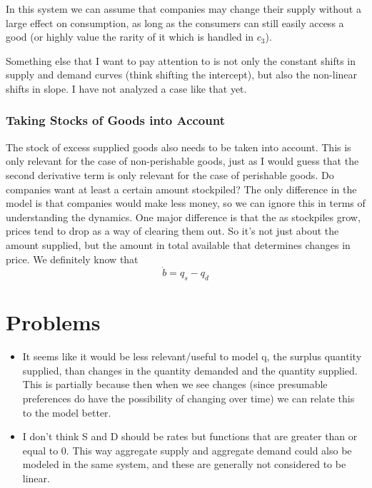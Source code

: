 \documentclass{article}
\begin{document}
In this system we can assume that companies may change their supply without a large effect on consumption, as long as the consumers can still easily access a good (or highly value the rarity of it which is handled in $c_3$).

Something else that I want to pay attention to is not only the constant shifts in supply and demand curves (think shifting the intercept), but also the non-linear shifts in slope. I have not analyzed a case like that yet.

\subsubsection{Taking Stocks of Goods into Account}
The stock of excess supplied goods also needs to be taken into account. This is only relevant for the case of non-perishable goods, just as I would guess that the second derivative term is only relevant for the case of perishable goods. Do companies want at least a certain amount stockpiled? The only difference in the model is that companies would make less money, so we can ignore this in terms of understanding the dynamics. One major difference is that the as stockpiles grow, prices tend to drop as a way of clearing them out. So it's not just about the amount supplied, but the amount in total available that determines changes in price. We definitely know that 
\begin{equation*}
	\dot{b} = q_s - q_d
\end{equation*}



\section{Problems}
\begin{itemize}
	\item It seems like it would be less relevant/useful to model q, the surplus quantity supplied, than changes in the quantity demanded and the quantity supplied. This is partially because then when we see changes (since presumable preferences do have the possibility of changing over time) we can relate this to the model better.
	\item I don't think S and D should be rates but functions that are greater than or equal to 0. This way aggregate supply and aggregate demand could also be modeled in the same system, and these are generally not considered to be linear.
\end{itemize}
\end{document}
